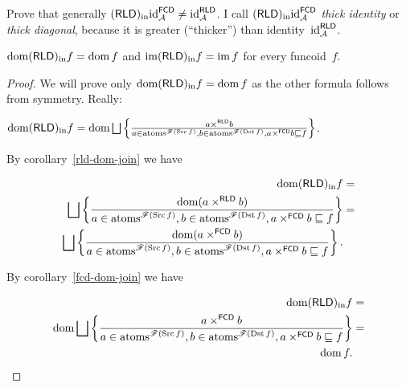 \begin{xca}
Prove that generally $(\mathsf{RLD})_{\mathrm{in}}{\operatorname{id}}_{\mathcal{A}}^{\mathsf{FCD}}\ne{\operatorname{id}}_{\mathcal{A}}^{\mathsf{RLD}}$.
I call $(\mathsf{RLD})_{\mathrm{in}}{\operatorname{id}}_{\mathcal{A}}^{\mathsf{FCD}}$ \emph{thick identity} or \emph{thick diagonal},
because it is greater (``thicker'') than identity~${\operatorname{id}}_{\mathcal{A}}^{\mathsf{RLD}}$.\end{xca}
\begin{prop}
$\operatorname{dom}(\mathsf{RLD})_{\mathrm{in}} f=\operatorname{dom} f$ and $\operatorname{im}(\mathsf{RLD})_{\mathrm{in}} f=\operatorname{im} f$ for every funcoid~$f$.\end{prop}
\begin{proof}
We will prove only $\operatorname{dom}(\mathsf{RLD})_{\mathrm{in}} f=\operatorname{dom} f$ as the other formula follows
from symmetry. Really:

$\dom\torldin f=\dom\bigsqcup\setcond{a\times^{\mathsf{RLD}}b}{a\in\atoms^{\mathscr{F}(\Src f)},b\in\atoms^{\mathscr{F}(\Dst f)},a\times^{\mathsf{FCD}}b\sqsubseteq f}$.

By corollary~\ref{rld-dom-join} we have

\begin{align*}
\dom\torldin f & =\\
\bigsqcup\setcond{\dom(a\times^{\mathsf{RLD}}b)}{a\in\atoms^{\mathscr{F}(\Src f)},b\in\atoms^{\mathscr{F}(\Dst f)},a\times^{\mathsf{FCD}}b\sqsubseteq f} & =\\
\bigsqcup\setcond{\dom(a\times^{\mathsf{FCD}}b)}{a\in\atoms^{\mathscr{F}(\Src f)},b\in\atoms^{\mathscr{F}(\Dst f)},a\times^{\mathsf{FCD}}b\sqsubseteq f}.
\end{align*}


By corollary~\ref{fcd-dom-join} we have

\begin{align*}
\dom\torldin f & =\\
\dom\bigsqcup\setcond{a\times^{\mathsf{FCD}}b}{a\in\atoms^{\mathscr{F}(\Src f)},b\in\atoms^{\mathscr{F}(\Dst f)},a\times^{\mathsf{FCD}}b\sqsubseteq f} & =\\
\dom f.
\end{align*}
\end{proof}

